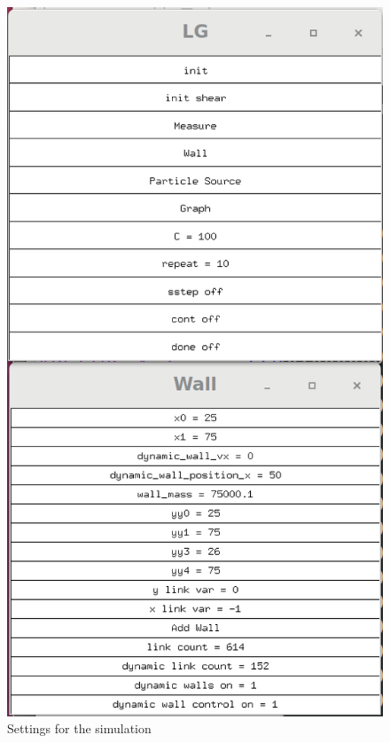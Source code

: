 \documentclass{article}
\begin{document}
\begin{figure}[H]
\includegraphics[scale=0.35]{A1_p0.png}
\caption{\label{fig} Settings for the simulation}
\end{figure}
\end{document}
